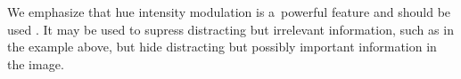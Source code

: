 

\vskip1mm\noindent
We emphasize that hue intensity modulation is a~powerful feature and should be used . It may be used to supress distracting but irrelevant information, such as in the example above, but  hide distracting but possibly important information in the image.
